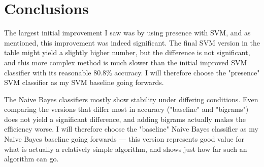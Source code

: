 \documentclass[12pt,a4paper,twoside]{article}
\begin{document}
\section{Conclusions}

The largest initial improvement I saw was by using presence with SVM, and as mentioned, this improvement was indeed significant. The final SVM version in the table might yield a slightly higher number, but the difference is not significant, and this more complex method is much slower than the initial improved SVM classifier with its reasonable 80.8\% accuracy. I will therefore choose the "presence" SVM classifier as my SVM baseline going forwards.

The Naive Bayes classifiers mostly show stability under differing conditions. Even comparing the versions that differ most in accuracy ("baseline" and "bigrams") does not yield a significant difference, and adding bigrams actually makes the efficiency worse. I will therefore choose the "baseline" Naive Bayes classifier as my Naive Bayes baseline going forwards --- this version represents good value for what is actually a relatively simple algorithm, and shows just how far such an algorithm can go.
\end{document}
